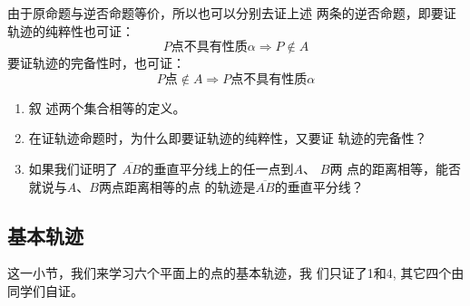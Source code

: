 由于原命题与逆否命题等价，所以也可以分别去证上述
两条的逆否命题，即要证轨迹的纯粹性也可证：
\[P\text{点不具有性质}\alpha\Rightarrow P\notin A\]
要证轨迹的完备性时，也可证：
\[P\text{点}\notin A\Rightarrow P\text{点不具有性质}\alpha\]

\begin{ex}
\begin{enumerate}
\item 叙
述两个集合相等的定义。
\item 在证轨迹命题时，为什么即要证轨迹的纯粹性，又要证
轨迹的完备性？
\item 如果我们证明了
$\overline{AB}$的垂直平分线上的任一点到$A$、
$B$两
点的距离相等，能否就说与$A$、$B$两点距离相等的点
的轨迹是$\overline{AB}$的垂直平分线？
\end{enumerate}
\end{ex}


\subsection{基本轨迹}
这一小节，我们来学习六个平面上的点的基本轨迹，我
们只证了1和4, 其它四个由同学们自证。












